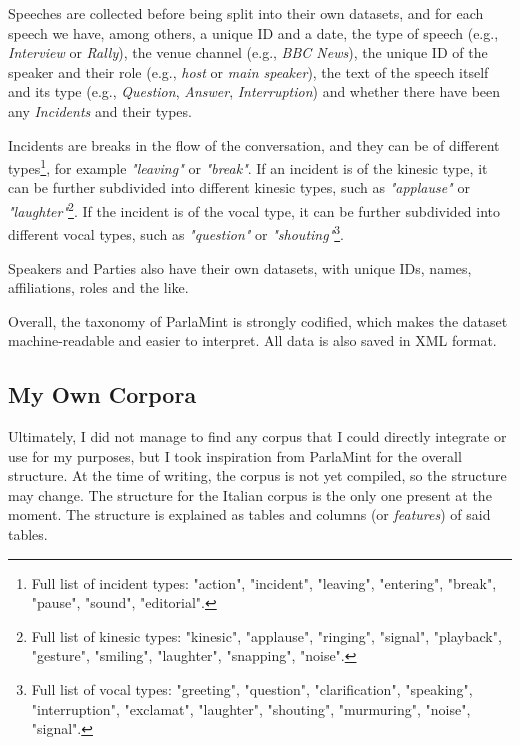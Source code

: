 Speeches are collected before being split into their own datasets, and for each speech we have, among others, a unique ID and a date, the type of speech (e.g., \textit{Interview} or \textit{Rally}), the venue channel (e.g., \textit{BBC News}), the unique ID of the speaker and their role (e.g., \textit{host} or \textit{main speaker}), the text of the speech itself and its type (e.g., \textit{Question}, \textit{Answer}, \textit{Interruption}) and whether there have been any \textit{Incidents} and their types.

Incidents are breaks in the flow of the conversation, and they can be of different types\footnote{Full list of incident types: "action", "incident", "leaving", "entering", "break", "pause", "sound", "editorial".}, for example \textit{"leaving"} or \textit{"break"}. If an incident is of the kinesic type, it can be further subdivided into different kinesic types, such as \textit{"applause"} or \textit{"laughter"}\footnote{Full list of kinesic types: "kinesic", "applause", "ringing", "signal", "playback", "gesture", "smiling", "laughter", "snapping", "noise".}. If the incident is of the vocal type, it can be further subdivided into different vocal types, such as \textit{"question"} or \textit{"shouting"}\footnote{Full list of vocal types: "greeting", "question", "clarification", "speaking", "interruption", "exclamat", "laughter", "shouting", "murmuring", "noise", "signal".}.

Speakers and Parties also have their own datasets, with unique IDs, names, affiliations, roles and the like.

Overall, the taxonomy of ParlaMint is strongly codified, which makes the dataset machine-readable and easier to interpret. All data is also saved in XML format.

\subsection{My Own Corpora}

Ultimately, I did not manage to find any corpus that I could directly integrate or use for my purposes, but I took inspiration from ParlaMint for the overall structure. 
At the time of writing, the corpus is not yet compiled, so the structure may change. The structure for the Italian corpus is the only one present at the moment. The structure is explained as tables and columns (or \textit{features}) of said tables.

